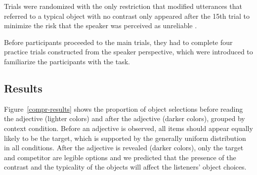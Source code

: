 \documentclass[10pt,letterpaper]{article}
\begin{document}

Trials were randomized with the only restriction that modified utterances that referred to a typical object with no contrast only appeared after the 15th trial to minimize the risk that the speaker was perceived as unreliable \cite{Grodner:2011}.

Before participants proceeded to the main trials, they had to complete four practice trials constructed from the speaker perspective, which were introduced to familiarize the participants with the task.


\subsection{Results}
Figure~\ref{compr-results} shows the proportion of object selections before reading the adjective (lighter colors) and after the adjective (darker colors), grouped by context condition. Before an adjective is observed, all items should appear equally likely to be the target, which is supported by the generally uniform distribution in all conditions. After the adjective is revealed (darker colors), only the target and competitor are legible options and we predicted that the presence of the contrast and the typicality of the objects will affect the listeners' object choices.
\end{document}
